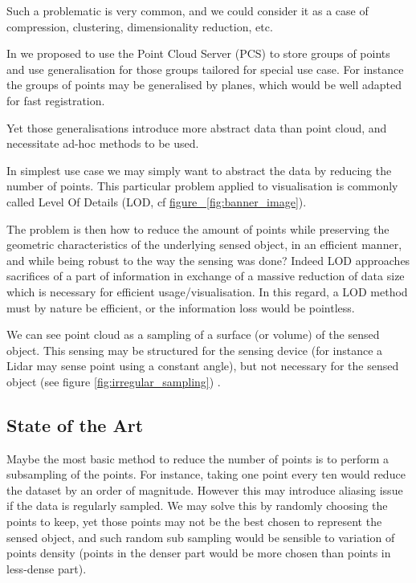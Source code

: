 		Such a problematic is very common, and we could consider it as a case of compression, clustering, dimensionality reduction, etc.
		
		In \cite{cura2015} we proposed to use the Point Cloud Server (PCS) to store groups of points and use generalisation for those groups tailored for special use case. For instance the groups of points may be generalised by planes, which would be well adapted for fast registration.
		
		Yet those generalisations introduce more abstract data than point cloud, and necessitate ad-hoc methods to be used.
		
		In simplest use case we may simply want to abstract the data by reducing the number of points.
		This particular problem applied to visualisation is commonly called Level Of Details (LOD, cf \href{banner_image}{figure ~\ref{fig:banner_image}}).
		
		The problem is then how to reduce the amount of points while preserving the geometric characteristics of the underlying sensed object, in an efficient manner, and while being robust to the way the sensing was done?
		Indeed LOD approaches sacrifices of a part of information in exchange of a massive reduction of data size which is necessary for efficient usage/visualisation. In this regard, a LOD method must by nature be efficient, or the information loss would be pointless.
		
		We can see point cloud as a sampling of a surface (or volume) of the sensed object. This sensing may be structured for the sensing device (for instance a Lidar may sense point using a constant angle), but not necessary for the sensed object (see figure \ref{fig:irregular_sampling})
		.
		

	\subsection{State of the Art} 
		
		Maybe the most basic method to reduce the number of points is to perform a subsampling of the points. For instance, taking one point every ten would reduce the dataset by an order of magnitude.
		However this may introduce aliasing issue if the data is regularly sampled. We may solve this by randomly choosing the points to keep,
		yet those points may not be the best chosen to represent the sensed object, and such random sub sampling would be sensible to variation of points density (points in the denser part would be more chosen than points in less-dense part).
		
